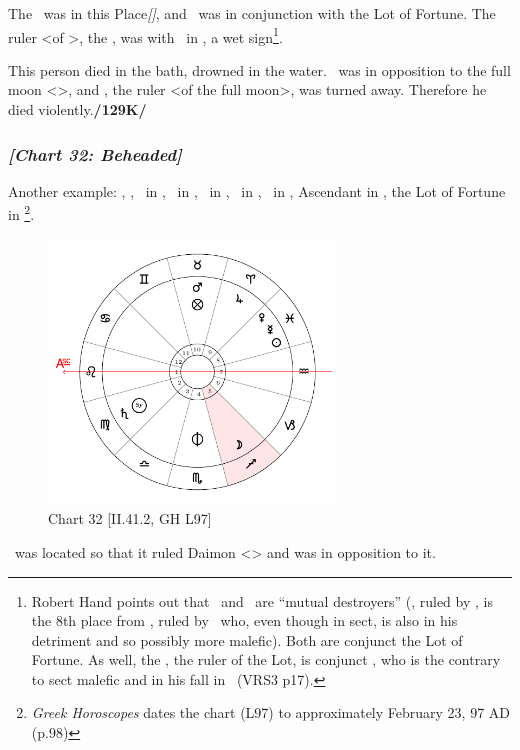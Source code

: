 The \Moon\, was in this Place\textsl{[\Pisces]}, and \Saturn\, was in conjunction with the Lot of Fortune. The ruler <of \Leo>, the \Sun, was with \Mars\, in \Cancer, a wet sign\footnote{Robert Hand points out that \Mercury\, and \Saturn\, are ``mutual destroyers'' (\Virgo, ruled by \Mercury, is the 8th place from \Capricorn, ruled by \Saturn\, who, even though in sect, is also in his detriment and so possibly more malefic). Both are conjunct the Lot of Fortune. As well, the \Sun, the ruler of the Lot, is conjunct \Mars, who is the contrary to sect malefic and in his fall in \Cancer\, (VRS3 p17).}. 

This person died in the bath, drowned in the water. \Mars\, was in opposition to the full moon <\Capricorn>, and \Saturn, the ruler <of the full moon>, was turned away. Therefore he died violently.\textbf{/129K/}
\newpage
\subsubsection{\textit{[Chart 32: Beheaded]}}
Another example: \Sun, \Mercury, \Venus\, in \Pisces, \Saturn\, in \Virgo, \Jupiter\, in \Aries, \Mars\, in \Taurus, \Moon\, in \Sagittarius, Ascendant in \Leo, the Lot of Fortune in \Taurus
\footnote{\textit{Greek Horoscopes} dates the chart (L97) to approximately February 23, 97 AD (p.98)}.  

\clearpage
\begin{figure}
\centering
\includegraphics[width=0.68\textwidth]{charts/2_41_2}
\caption{Chart 32 [II.41.2, GH L97]}
\label{fig:chart32}
\end{figure} 

\noindent \Mars\, was located so that it ruled Daimon <\Scorpio> and was in opposition to it. 

